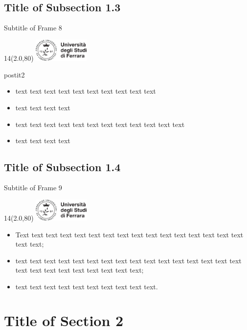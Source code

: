 \documentclass[11pt,xcolor={dvipsnames},default]{beamer} %
\newcommand{\MyLogo}{%
\begin{textblock}{14}(2.0,80)
 \includegraphics[height=1.15cm, angle=0]{logo}
\end{textblock}
}
\begin{document}
\subsection{Title of Subsection 1.3}
\begin{frame}{Subtitle of Frame 8}
\MyLogo
\begin{center}
\end{center}
\pause
\begin{beamercolorbox}[shadow=false, rounded=true]{postit2}
\begin{itemize}
\item text text text text text text text text text text
\item text text text text
\item text text text text text text text text text text text text
\item text text text text
\end{itemize}
\end{beamercolorbox}
\end{frame}

\subsection{Title of Subsection 1.4}
\begin{frame}{Subtitle of Frame 9}
\transdissolve
\MyLogo
\begin{itemize}
\item<1-> Text text text text text text text text text text text text text text text text text text;
\item<2-> text text text text text text text text text text text text text text text text text text text text text text text text text;
\item<3-> text text text text text text text text text text.
\end{itemize}
\end{frame}


\section{Title of Section 2}
\end{document}
